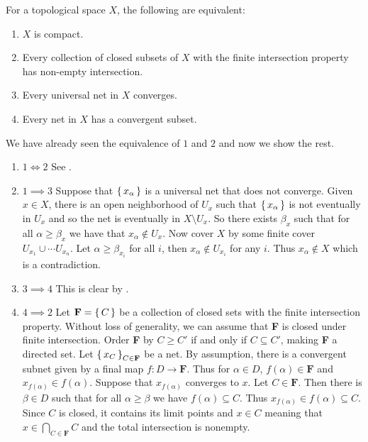\documentclass[letterpaper, 11pt, oneside]{book}
\begin{document}
\begin{thrm}\label{thrm: compact_iff_FIP_iff_universal_etc}
  For a topological space $X$, the following are equivalent:
  \begin{enumerate}
  \item $X$ is compact.
  \item Every collection of closed subsets of $X$ with the finite intersection property has non-empty intersection.
  \item Every universal net in $X$ converges.
  \item Every net in $X$ has a convergent subset.
  \end{enumerate}
\end{thrm}
\begin{pf}
  We have already seen the equivalence of $1$ and $2$ and now we show the rest.
  \begin{enumerate}
  \item[] $1 \iff 2$ See .
  \item[] $1 \implies 3$ Suppose that $\set{x_{\alpha}}$ is a universal net that does not converge.
        Given $x \in X$, there is an open neighborhood of $U_{x}$ such that $\set{x_{\alpha}}$ is not eventually in  $U_{x}$ and so the net is eventually in $X \setminus U_{x}$.
        So there exists $\beta_{x}$ such that for all $\alpha \geq \beta_{x}$ we have that $x_{\alpha} \notin U_{x}$.
        Now cover $X$ by some finite cover $U_{x_{1}} \cup \cdots U_{x_{n}}$.
        Let $\alpha \geq \beta_{x_{i}}$ for all $i$, then $x_{\alpha} \notin U_{x_{i}}$ for any $i$.
        Thus $x_{\alpha} \notin X$ which is a contradiction.
  \item[] $3 \implies 4$ This is clear by .

\clearpage

  \item[] $4 \implies 2$ Let $\textbf{F} = \set{C}$ be a collection of closed sets with the finite intersection property.
        Without loss of generality, we can assume that \textbf{F} is closed under finite intersection.
        Order \textbf{F} by $C \geq C'$ if and only if $C \subseteq C'$, making \textbf{F} a directed set.
        Let $\set{x_{C}}_{C \in \textbf{F}}$ be a net.
        By assumption, there is a convergent subnet given by a final map $f\colon D \to \textbf{F}$.
        Thus for $\alpha \in D$, $f(\alpha) \in \textbf{F}$ and $x_{f(\alpha)} \in f(\alpha)$.
        Suppose that $x_{f(\alpha)}$ converges to $x$.
        Let $C \in \textbf{F}$.
        Then there is $\beta \in D$ such that for all $\alpha \geq \beta$ we have $f(\alpha) \subseteq C$.
        Thus $x_{f(\alpha)} \in f(\alpha) \subseteq C$.
        Since $C$ is closed, it contains its limit points and $x \in C$ meaning that $x \in \bigcap_{C \in \textbf{F}} C$ and the total intersection is nonempty.
  \end{enumerate}
\end{pf}
\end{document}
